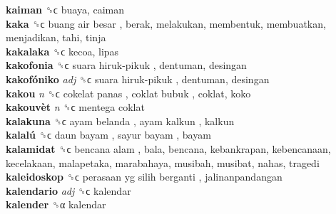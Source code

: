 \textbf{kaiman} ␝ϲ  buaya, caiman  \\
\textbf{kaka} ␝ϲ   buang air besar , berak, melakukan, membentuk, membuatkan, menjadikan, tahi, tinja  \\
\textbf{kakalaka} ␝ϲ  kecoa, lipas  \\
\textbf{kakofonia} ␝ϲ   suara hiruk-pikuk , dentuman, desingan  \\
\textbf{kakofóniko} \emph{adj}  ␝ϲ   suara hiruk-pikuk , dentuman, desingan  \\
\textbf{kakou} \emph{n}  ␝ϲ   cokelat panas ,  coklat bubuk , coklat, koko  \\
\textbf{kakouvèt} \emph{n}  ␝ϲ   mentega coklat   \\
\textbf{kalakuna} ␝ϲ   ayam belanda ,  ayam kalkun , kalkun  \\
\textbf{kalalú} ␝ϲ   daun bayam ,  sayur bayam , bayam  \\
\textbf{kalamidat} ␝ϲ   bencana alam , bala, bencana, kebankrapan, kebencanaan, kecelakaan, malapetaka, marabahaya, musibah, musibat, nahas, tragedi  \\
\textbf{kaleidoskop} ␝ϲ   perasaan yg silih berganti , jalinanpandangan  \\
\textbf{kalendario} \emph{adj}  ␝ϲ  kalendar  \\
\textbf{kalender} ␝α  kalendar  \\
